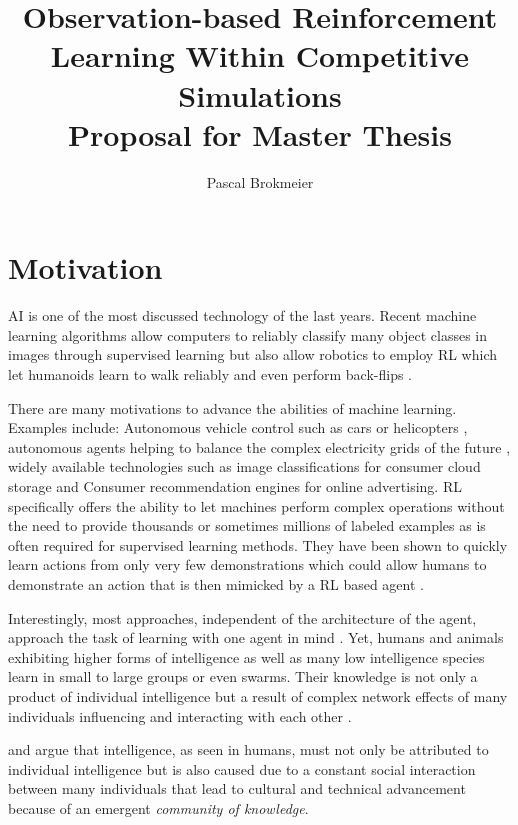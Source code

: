 \documentclass[12pt,a4paper]{article}
\title{Observation-based Reinforcement Learning Within Competitive Simulations\\
\small{Proposal for Master Thesis}}
\author{Pascal Brokmeier}
\begin{document}
\maketitle

\section{Motivation}

\ac{AI} is one of the most discussed technology of the last years. Recent machine learning algorithms allow computers to reliably classify many object classes in images \cite{krizhevsky2012imagenet} through supervised learning but also allow robotics to employ \ac{RL} which let humanoids learn to walk reliably and even perform back-flips \cite{proximalpolicyopt}.

There are many motivations to advance the abilities of machine learning. Examples include: Autonomous vehicle control such as cars or helicopters \cite{abbeel2010autonomous}, autonomous agents helping to balance the complex electricity grids of the future \cite{peters2013reinforcement}, widely available technologies such as image classifications for consumer cloud storage and Consumer recommendation engines for online advertising. \ac{RL} specifically offers the ability to let machines perform complex operations without the need to provide thousands or sometimes millions of labeled examples as is often required for supervised learning methods. They have been shown to quickly learn actions from only very few demonstrations which could allow humans to demonstrate an action that is then mimicked by a \ac{RL} based agent \cite{duan2017one}.

Interestingly, most approaches, independent of the architecture of the agent, approach the task of learning with one agent in mind \cite[p.694ff]{russell2016artificial}. Yet, humans and animals exhibiting higher forms of intelligence as well as many low intelligence species learn in small to large groups or even swarms. Their knowledge is not only a product of individual intelligence but a result of complex network effects of many individuals influencing and interacting with each other \cite[p.200f]{sloman2017knowledge}.

\cite{sloman2017knowledge} and \cite{wegner1995computer} argue that intelligence, as seen in humans, must not only be attributed to individual intelligence but is also caused due to a constant social interaction between many individuals that lead to cultural and technical advancement because of an emergent \emph{community of knowledge}.
\end{document}
